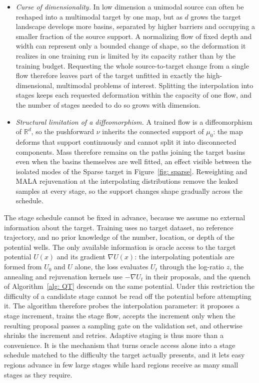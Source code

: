 \documentclass{article}
\begin{document}
\begin{itemize}
    \item \emph{Curse of dimensionality.} In low dimension a unimodal source can often be reshaped into a multimodal target by one map, but as $d$ grows the target landscape develops more basins, separated by higher barriers and occupying a smaller fraction of the source support. A normalizing flow of fixed depth and width can represent only a bounded change of shape, so the deformation it realizes in one training run is limited by its capacity rather than by the training budget. Requesting the whole source-to-target change from a single flow therefore leaves part of the target unfitted in exactly the high-dimensional, multimodal problems of interest. Splitting the interpolation into stages keeps each requested deformation within the capacity of one flow, and the number of stages needed to do so grows with dimension.

    \item \emph{Structural limitation of a diffeomorphism.} A trained flow is a diffeomorphism of $\mathbb R^d$, so the pushforward $\nu$ inherits the connected support of $\mu_0$: the map deforms that support continuously and cannot split it into disconnected components. Mass therefore remains on the paths joining the target basins even when the basins themselves are well fitted, an effect visible between the isolated modes of the Sparse target in Figure~\ref{fig: sparse}. Reweighting and MALA rejuvenation at the interpolating distributions remove the leaked samples at every stage, so the support changes shape gradually across the schedule.
\end{itemize}

The stage schedule cannot be fixed in advance, because we assume no external information about the target. Training uses no target dataset, no reference trajectory, and no prior knowledge of the number, location, or depth of the potential wells. The only available information is oracle access to the target potential $U(x)$ and its gradient $\nabla U(x)$: the interpolating potentials are formed from $U_0$ and $U$ alone, the loss evaluates $U_{t}$ through the log-ratio $z$, the annealing and rejuvenation kernels use $-\nabla U_{t}$ in their proposals, and the quench of Algorithm~\ref{alg: QT} descends on the same potential. Under this restriction the difficulty of a candidate stage cannot be read off the potential before attempting it. The algorithm therefore probes the interpolation parameter: it proposes a stage increment, trains the stage flow, accepts the increment only when the resulting proposal passes a sampling gate on the validation set, and otherwise shrinks the increment and retries. Adaptive staging is thus more than a convenience. It is the mechanism that turns oracle access alone into a stage schedule matched to the difficulty the target actually presents, and it lets easy regions advance in few large stages while hard regions receive as many small stages as they require.
\end{document}
